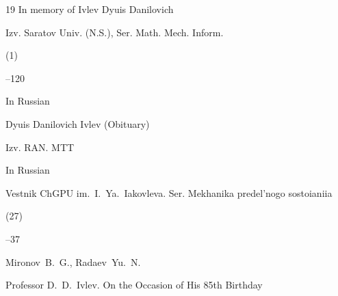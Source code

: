 \begin{thebibliography}{19}
\paper In memory of Ivlev Dyuis Danilovich

\jour Izv. Saratov Univ. (N.S.), Ser. Math. Mech. Inform.



(1)

--120




\lang In Russian

\paper Dyuis Danilovich Ivlev (Obituary) 

\jour Izv. RAN. MTT











\lang In Russian

\jour Vestnik \mbox{ChGPU} im.~I.~Ya.~Iakovleva. Ser. Mekhanika predel'nogo sostoianiia


(27)

–37

\by  Mironov~B.~G., Radaev~Yu.~N.

\paper Professor D.~D.~Ivlev. On the Occasion of His 85th Birthday 





\end{thebibliography}



\EngDate



\renewcommand{\baselinestretch}{0.9}



\Russian

\ruannot

\newpage



%

